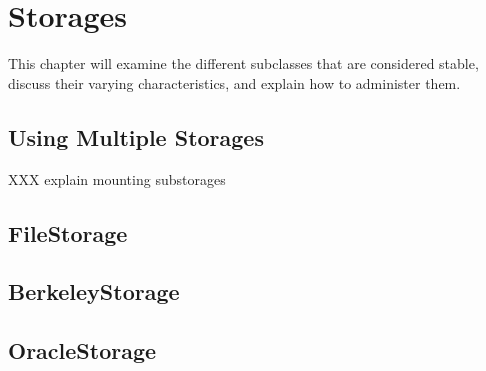 

\section{Storages}

This chapter will examine the different  subclasses
that are considered stable, discuss their varying characteristics, and
explain how to administer them.

\subsection{Using Multiple Storages}

XXX explain mounting substorages

\subsection{FileStorage}

\subsection{BerkeleyStorage}

\subsection{OracleStorage}

